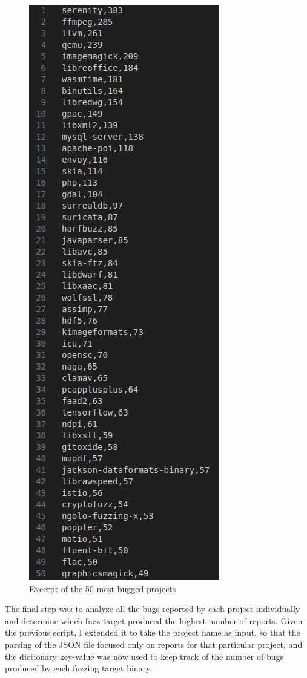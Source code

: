 \newpage
\begin{figure}[h]
\centering
\includegraphics[scale=0.47]{foto/list.png}
\caption{Excerpt of the 50 most bugged projects}
\label{fig:list}
\end{figure}

The final step was to analyze all the bugs reported by each project individually and determine which fuzz target produced the highest number of reports. Given the previous script, I extended it to take the project name as input, so that the parsing of the JSON file focused only on reports for that particular project, and the dictionary key-value was now used to keep track of the number of bugs produced by each fuzzing target binary.


